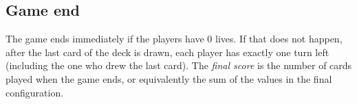 \subsection{Game end}

The game ends immediately if the players have 0 lives. If that does not happen, after the last card of the deck is drawn, each player has exactly one turn left (including the one who drew the last card). The \emph{final score} is the number of cards played when the game ends, or equivalently the sum of the values in the final configuration.

%
